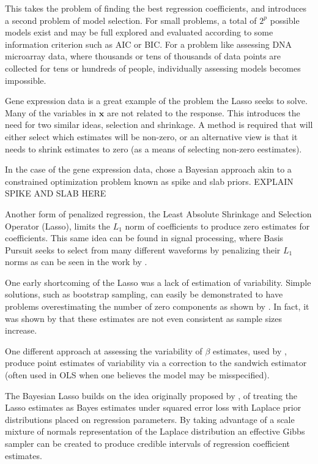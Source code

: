 \documentclass{uwstat572}
\begin{document}
This takes the problem of finding the best regression coefficients, and introduces a second problem of model selection. For small problems, a total of $2^p$ possible models exist and may be full explored and evaluated according to some information criterion such as AIC or BIC. For a problem like assessing DNA microarray data, where thousands or tens of thousands of data points are collected for tens or hundreds of people, individually assessing models becomes impossible.

Gene expression data is a great example of the problem the Lasso seeks to solve. Many of the variables in $\mathbf{x}$ are not related to the response. This introduces the need for two similar ideas, selection and shrinkage. A method is required that will either select which estimates will be non-zero, or an alternative view is that it needs to shrink estimates to zero (as a means of selecting non-zero eestimates). 

In the case of the gene expression data, \cite{ishwaran2005spike} chose a Bayesian approach akin to a constrained optimization problem known as spike and slab priors. EXPLAIN SPIKE AND SLAB HERE

Another form of penalized regression, the Least Absolute Shrinkage and Selection Operator (Lasso), limits the $L_1$ norm of coefficients to produce zero estimates for coefficients. This same idea can be found in signal processing, where Basis Pursuit seeks to select from many different waveforms by penalizing their $L_1$ norms as can be seen in the work by \cite{chen2001atomic}.

One early shortcoming of the Lasso was a lack of estimation of variability. Simple solutions, such as bootstrap sampling, can easily be demonstrated to have problems overestimating the number of zero components as shown by \cite{kyung2010penalized}. In fact, it was shown by \cite{shao1996bootstrap} that these estimates are not even consistent as sample sizes increase. 

One different approach at assessing the variability of $\beta$ estimates, used by \cite{fan2001variable}, produce point estimates of variability via a correction to the sandwich estimator (often used in OLS when one believes the model may be misspecified).

The Bayesian Lasso builds on the idea originally proposed by \cite{tibshirani1996regression}, of treating the Lasso estimates as Bayes estimates under squared error loss with Laplace prior distributions placed on regression parameters. By taking advantage of a scale mixture of normals representation of the Laplace distribution an effective Gibbs sampler can be created to produce credible intervals of regression coefficient estimates.
\end{document}
